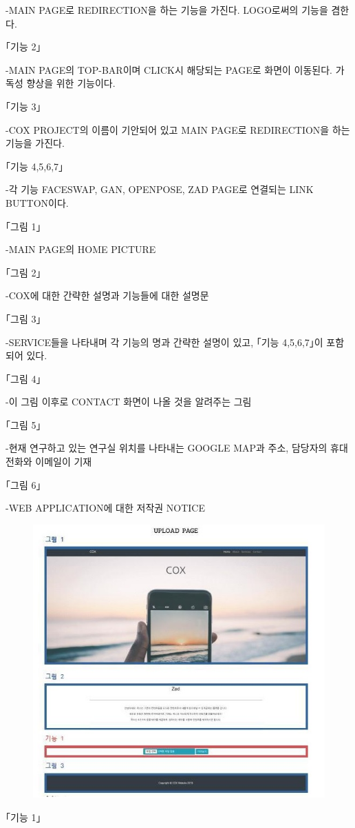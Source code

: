 \documentclass{oblivoir}
\begin{document}
-MAIN PAGE로 REDIRECTION을 하는 기능을 가진다. LOGO로써의 기능을 겸한다.

｢기능 2｣

-MAIN PAGE의 TOP-BAR이며 CLICK시 해당되는 PAGE로 화면이 이동된다. 가독성 향상을 위한 기능이다.

｢기능 3｣

-COX PROJECT의 이름이 기안되어 있고 MAIN PAGE로 REDIRECTION을 하는 기능을 가진다.

｢기능 4,5,6,7｣

-각 기능 FACESWAP, GAN, OPENPOSE, ZAD PAGE로 연결되는 LINK BUTTON이다.

｢그림 1｣

-MAIN PAGE의 HOME PICTURE

｢그림 2｣

-COX에 대한 간략한 설명과 기능들에 대한 설명문

｢그림 3｣

-SERVICE들을 나타내며 각 기능의 명과 간략한 설명이 있고, ｢기능 4,5,6,7｣이 포함되어 있다.

｢그림 4｣

-이 그림 이후로 CONTACT 화면이 나올 것을 알려주는 그림

｢그림 5｣

-현재 연구하고 있는 연구실 위치를 나타내는 GOOGLE MAP과 주소, 담당자의 휴대전화와 이메일이 기재

｢그림 6｣

-WEB APPLICATION에 대한 저작권 NOTICE

\newpage

\begin{figure}[h!]
    \centering
    \includegraphics{pic/chp6/img934}
\end{figure}
｢기능 1｣
\end{document}
